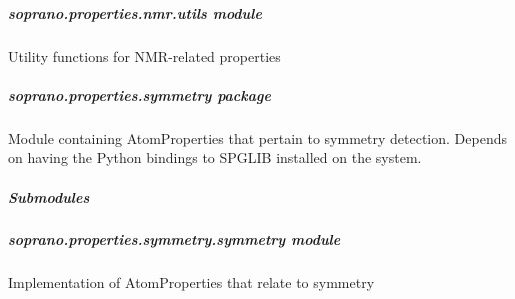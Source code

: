 \documentclass[letterpaper,10pt,english]{sphinxmanual}
\begin{document}
\begin{fulllineitems}
\begin{fulllineitems}
\label{doctree/soprano.properties.nmr.ms:soprano.properties.nmr.ms.MSSpan.default_name}
\end{fulllineitems}


\begin{fulllineitems}
\label{doctree/soprano.properties.nmr.ms:soprano.properties.nmr.ms.MSSpan.default_params}
\end{fulllineitems}


\begin{fulllineitems}
\label{doctree/soprano.properties.nmr.ms:soprano.properties.nmr.ms.MSSpan.extract}
\end{fulllineitems}


\end{fulllineitems}



\subparagraph{soprano.properties.nmr.utils module}
\label{doctree/soprano.properties.nmr.utils:soprano-properties-nmr-utils-module}\label{doctree/soprano.properties.nmr.utils:module-soprano.properties.nmr.utils}\label{doctree/soprano.properties.nmr.utils::doc}
Utility functions for NMR-related properties


\subparagraph{soprano.properties.symmetry package}
\label{doctree/soprano.properties.symmetry::doc}\label{doctree/soprano.properties.symmetry:soprano-properties-symmetry-package}\label{doctree/soprano.properties.symmetry:module-soprano.properties.symmetry}
Module containing AtomProperties that pertain to symmetry detection.
Depends on having the Python bindings to SPGLIB installed on the system.


\subparagraph{Submodules}
\label{doctree/soprano.properties.symmetry:submodules}

\subparagraph{soprano.properties.symmetry.symmetry module}
\label{doctree/soprano.properties.symmetry.symmetry:module-soprano.properties.symmetry.symmetry}\label{doctree/soprano.properties.symmetry.symmetry::doc}\label{doctree/soprano.properties.symmetry.symmetry:soprano-properties-symmetry-symmetry-module}
Implementation of AtomProperties that relate to symmetry
\end{document}
